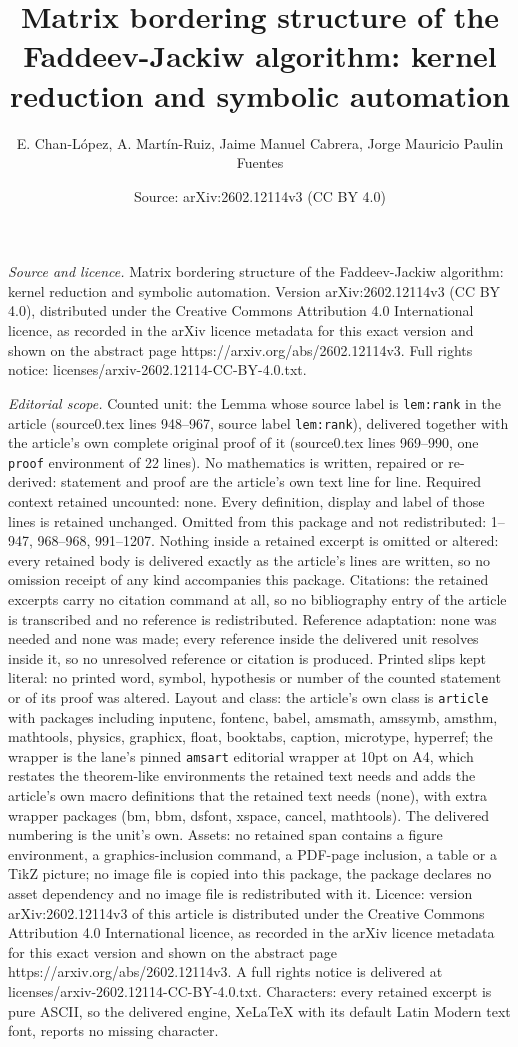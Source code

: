 \documentclass[10pt,a4paper]{amsart}
\title[Matrix bordering structure of the Faddeev-Jackiw algorithm: ]{Matrix bordering structure of the Faddeev-Jackiw algorithm: kernel reduction and symbolic automation}
\author{E. Chan-L\'opez, A. Mart\'in-Ruiz, Jaime Manuel Cabrera, Jorge Mauricio Paulin Fuentes}
\date{Source: arXiv:2602.12114v3 (CC BY 4.0)}
\begin{document}
\maketitle

\noindent\emph{Source and licence.} Matrix bordering structure of the Faddeev-Jackiw algorithm: kernel reduction and symbolic automation. Version arXiv:2602.12114v3 (CC BY 4.0), distributed under the Creative Commons Attribution 4.0 International licence, as recorded in the arXiv licence metadata for this exact version and shown on the abstract page https://arxiv.org/abs/2602.12114v3. Full rights notice: licenses/arxiv-2602.12114-CC-BY-4.0.txt.\par\smallskip

\noindent\textit{Editorial scope.} Counted unit: the Lemma whose source label is \texttt{lem:rank} in the article (source0.tex lines 948--967, source label \texttt{lem:rank}), delivered together with the article's own complete original proof of it (source0.tex lines 969--990, one \texttt{proof} environment of 22 lines). No mathematics is written, repaired or re-derived: statement and proof are the article's own text line for line. Required context retained uncounted: none. Every definition, display and label of those lines is retained unchanged. Omitted from this package and not redistributed: 1--947, 968--968, 991--1207. Nothing inside a retained excerpt is omitted or altered: every retained body is delivered exactly as the article's lines are written, so no omission receipt of any kind accompanies this package. Citations: the retained excerpts carry no citation command at all, so no bibliography entry of the article is transcribed and no reference is redistributed. Reference adaptation: none was needed and none was made; every reference inside the delivered unit resolves inside it, so no unresolved reference or citation is produced. Printed slips kept literal: no printed word, symbol, hypothesis or number of the counted statement or of its proof was altered. Layout and class: the article's own class is \texttt{article} with packages including inputenc, fontenc, babel, amsmath, amssymb, amsthm, mathtools, physics, graphicx, float, booktabs, caption, microtype, hyperref; the wrapper is the lane's pinned \texttt{amsart} editorial wrapper at 10pt on A4, which restates the theorem-like environments the retained text needs and adds the article's own macro definitions that the retained text needs (none), with extra wrapper packages (bm, bbm, dsfont, xspace, cancel, mathtools). The delivered numbering is the unit's own. Assets: no retained span contains a figure environment, a graphics-inclusion command, a PDF-page inclusion, a table or a TikZ picture; no image file is copied into this package, the package declares no asset dependency and no image file is redistributed with it. Licence: version arXiv:2602.12114v3 of this article is distributed under the Creative Commons Attribution 4.0 International licence, as recorded in the arXiv licence metadata for this exact version and shown on the abstract page https://arxiv.org/abs/2602.12114v3. A full rights notice is delivered at licenses/arxiv-2602.12114-CC-BY-4.0.txt. Characters: every retained excerpt is pure ASCII, so the delivered engine, XeLaTeX with its default Latin Modern text font, reports no missing character.
\end{document}

